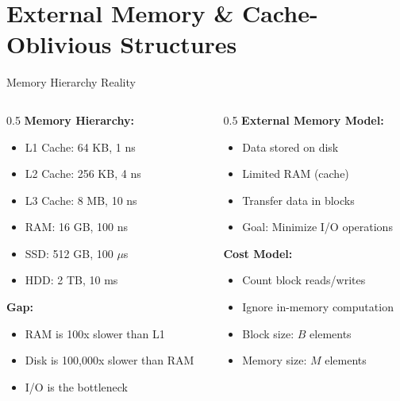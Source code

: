 \documentclass[aspectratio=169,xcolor=dvipsnames]{beamer}
\begin{document}
\section{External Memory \& Cache-Oblivious Structures}

\begin{frame}{Memory Hierarchy Reality}
  \begin{columns}
    \begin{column}{0.5\textwidth}
      \textbf{Memory Hierarchy:}
      \begin{itemize}
        \item L1 Cache: 64 KB, 1 ns
        \item L2 Cache: 256 KB, 4 ns
        \item L3 Cache: 8 MB, 10 ns
        \item RAM: 16 GB, 100 ns
        \item SSD: 512 GB, 100 $\mu$s
        \item HDD: 2 TB, 10 ms
      \end{itemize}

      \vspace{0.3cm}
      \textbf{Gap:}
      \begin{itemize}
        \item RAM is 100x slower than L1
        \item Disk is 100,000x slower than RAM
        \item I/O is the bottleneck
      \end{itemize}
    \end{column}

    \begin{column}{0.5\textwidth}
      \textbf{External Memory Model:}
      \begin{itemize}
        \item Data stored on disk
        \item Limited RAM (cache)
        \item Transfer data in blocks
        \item Goal: Minimize I/O operations
      \end{itemize}

      \vspace{0.3cm}
      \textbf{Cost Model:}
      \begin{itemize}
        \item Count block reads/writes
        \item Ignore in-memory computation
        \item Block size: $B$ elements
        \item Memory size: $M$ elements
      \end{itemize}


\end{column}
\end{columns}
\end{frame}
\end{document}
